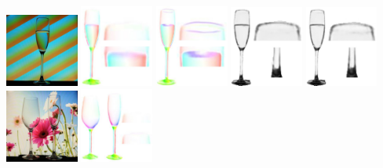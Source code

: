     \includegraphics[width=0.180\textwidth]{images/compare/7_water5_0.90__6_tar.jpg}
    \includegraphics[width=0.180\textwidth]{images/compare/7_combine_flow.jpg}
    \includegraphics[width=0.180\textwidth]{images/compare/7_combine_r_flow.jpg}
    \includegraphics[width=0.180\textwidth]{images/compare/7_combine_rho.jpg}
    \includegraphics[width=0.180\textwidth]{images/compare/7_combine_r_rho.jpg}
    \\
    \includegraphics[width=0.180\textwidth]{images/compare/5_multi2_1.00__6_tar.jpg}
    \includegraphics[width=0.180\textwidth]{images/compare/5_combine_flow.jpg}
